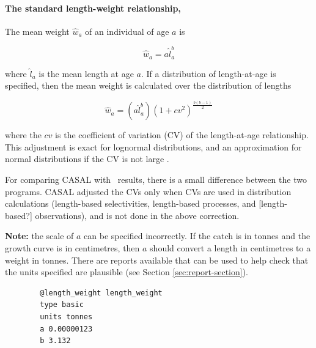 \paragraph[Basic]{The standard length-weight relationship, }\label{Length-weight relationship:Basic}

The mean weight $\hat{w}_a$ of an individual of age $a$ is

  \begin{equation}
    \hat{w}_a=a \hat{l}_a^b
  \end{equation}

where $\hat{l}_a$ is the mean length at age $a$. If a distribution of length-at-age is specified, then the mean weight is calculated over the distribution of lengths

  \begin{equation}
	  \hat{w}_a=(a\hat{l}_a^b)(1+cv^2)^{\frac{b(b-1)}{2}}
  \end{equation}

where the $cv$ is the coefficient of variation (CV) of the length-at-age relationship. This adjustment is exact for lognormal distributions, and an approximation for normal distributions if the CV is not large \citep{1388}.

For comparing CASAL with \CNAME~results, there is a small difference between the two programs. CASAL adjusted the CVs  only when CVs are used in distribution calculations (length-based selectivities, length-based processes, and [length-based?] observations), and is not done in the above correction.

\textbf{Note:}  the scale of $a$ can be specified incorrectly. If the catch is in tonnes and the growth curve is in centimetres, then $a$ should convert a length in centimetres to a weight in tonnes. There are reports available that can be used to help check that the units specified are plausible (see Section \ref{sec:report-section}).

{\small{\begin{verbatim}
		@length_weight length_weight
		type basic
		units tonnes
		a 0.00000123
		b 3.132
\end{verbatim}}}

\subsection{\label{sec:weight-at-age}}

